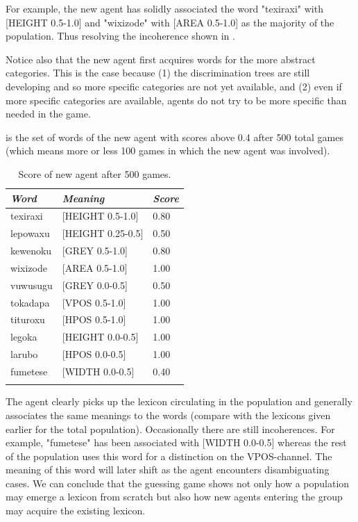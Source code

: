 For example, the new agent
has solidly associated the word "texiraxi" with 
{}[HEIGHT 0.5-1.0] and "wixizode" with [AREA 0.5-1.0]
as the majority of the population. Thus resolving the 
incoherence shown in . 

Notice also that the new agent first acquires words 
for the more abstract categories. This is the case 
because (1) the discrimination trees are still developing
and so more specific categories are not yet available, 
and (2) even if more specific categories are available, 
agents do not try to be more specific than needed in 
the game. 

 is the set of words of the new agent
with scores above 0.4 after 
500 total games (which means more or less 100 games 
in which the new agent was involved). 
\begin{table}
\begin{center}
\begin{tabular}{ l  l  l }
\lsptoprule
{\itshape Word} & {\itshape Meaning} & {\itshape Score} \\ \midrule
texiraxi &  [HEIGHT 0.5-1.0] & 0.80 \\ 
lepowaxu &  [HEIGHT 0.25-0.5] & 0.50 \\ 
kewenoku &  [GREY 0.5-1.0] & 0.80 \\ 
wixizode & [AREA 0.5-1.0] & 1.00 \\ 
vuwusugu & [GREY 0.0-0.5] & 0.50 \\ 
tokadapa &  [VPOS 0.5-1.0] & 1.00 \\ 
tituroxu &  [HPOS 0.5-1.0] & 1.00 \\ 
legoka   &  [HEIGHT 0.0-0.5] & 1.00 \\ 
larubo   &  [HPOS 0.0-0.5] & 1.00 \\ 
fumetese &  [WIDTH 0.0-0.5] & 0.40 \\ 
\lspbottomrule
\end{tabular}
\caption{\label{tab:newagents} Score of new agent after 500 games.}
\end{center}
\end{table}
The agent clearly picks up the lexicon circulating
in the population and generally associates the 
same meanings to the words (compare with the 
lexicons given earlier for the total population). 
Occasionally there are still incoherences. For example, 
"fumetese" has been associated with [WIDTH 0.0-0.5] 
whereas the rest of the population uses this word
for a distinction on the VPOS-channel. The meaning
of this word will later shift as the agent encounters
disambiguating cases. We can conclude that the 
guessing game shows not only how a population may 
emerge a lexicon from scratch but also how new 
agents entering the group may acquire the existing 
lexicon.  

